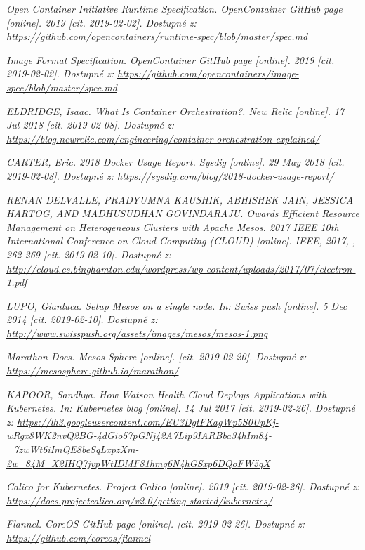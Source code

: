 \begin{thebibliography}{10}
	\emph{Open Container Initiative Runtime Specification. OpenContainer GitHub page [online]. 2019 [cit. 2019-02-02]. Dostupné z: \url{https://github.com/opencontainers/runtime-spec/blob/master/spec.md}}

	\emph{Image Format Specification. OpenContainer GitHub page [online]. 2019 [cit. 2019-02-02]. Dostupné z: \url{https://github.com/opencontainers/image-spec/blob/master/spec.md}}

	\emph{ELDRIDGE, Isaac. What Is Container Orchestration?. New Relic [online]. 17 Jul 2018 [cit. 2019-02-08]. Dostupné z: \url{https://blog.newrelic.com/engineering/container-orchestration-explained/}}

	\emph{CARTER, Eric. 2018 Docker Usage Report. Sysdig [online]. 29 May 2018 [cit. 2019-02-08]. Dostupné z: \url{https://sysdig.com/blog/2018-docker-usage-report/}}

	\emph{RENAN DELVALLE, PRADYUMNA KAUSHIK, ABHISHEK JAIN, JESSICA HARTOG, AND MADHUSUDHAN GOVINDARAJU. Owards Efficient Resource Management on Heterogeneous Clusters with Apache Mesos. 2017 IEEE 10th International Conference on Cloud Computing (CLOUD) [online]. IEEE, 2017, , 262-269 [cit. 2019-02-10]. Dostupné z: \url{http://cloud.cs.binghamton.edu/wordpress/wp-content/uploads/2017/07/electron-1.pdf}}

	\emph{LUPO, Gianluca. Setup Mesos on a single node. In: Swiss push [online]. 5 Dec 2014 [cit. 2019-02-10]. Dostupné z: \url{http://www.swisspush.org/assets/images/mesos/mesos-1.png}}

	\emph{Marathon Docs. Mesos Sphere [online]. [cit. 2019-02-20]. Dostupné z: \url{https://mesosphere.github.io/marathon/}}

	\emph{KAPOOR, Sandhya. How Watson Health Cloud Deploys Applications with Kubernetes. In: Kubernetes blog [online]. 14 Jul 2017 [cit. 2019-02-26]. Dostupné z: \url{https://lh3.googleusercontent.com/EU3DgtFKagWp5S0UpKj-wRgx8WK2nvQ2BG-4dGio57pGNj42A7Lip9IARBba34hIm84-_7zwWt6iImQE8beSqLxpzXm-2w_84M_X2IHQ7jvpWtIDMF81hmq6N4hGSxp6DQoFW5qX}}

	\emph{Calico for Kubernetes. Project Calico [online]. 2019 [cit. 2019-02-26]. Dostupné z: \url{https://docs.projectcalico.org/v2.0/getting-started/kubernetes/}}

	\emph{Flannel. CoreOS GitHub page [online]. [cit. 2019-02-26]. Dostupné z: \url{https://github.com/coreos/flannel}}


\end{thebibliography}
